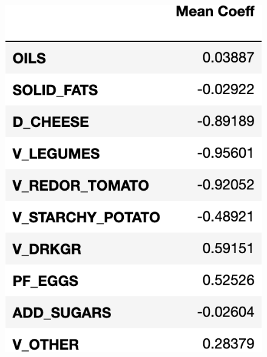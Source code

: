 \documentclass{article}
\begin{document}
\begin{figure}[htb]
\begin{minipage}[b]{.48\linewidth}
  \centering
  \centerline{\includegraphics[scale=0.3]{Coeff_Values_Top10.png}}
\end{minipage}
\hfill
\begin{minipage}[b]{0.48\linewidth}
  \centering

\end{minipage}
\end{figure}
\end{document}
